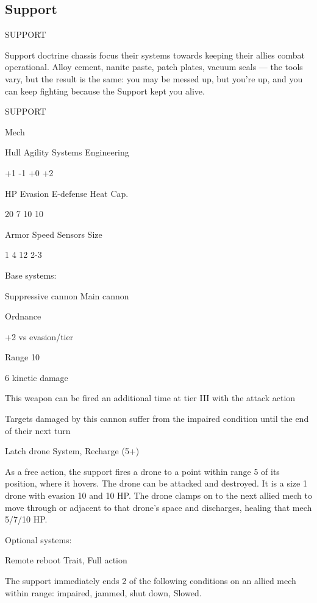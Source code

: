 \subsection{Support}

                                               SUPPORT

Support doctrine chassis focus their systems towards keeping their allies combat operational.
Alloy cement, nanite paste, patch plates, vacuum seals — the tools vary, but the result is the
same: you may be messed up, but you’re up, and you can keep fighting because the Support
kept you alive.


 SUPPORT

 Mech

 Hull       Agility      Systems       Engineering

 +1         -1           +0            +2

 HP         Evasion      E-defense     Heat Cap.

 20         7            10            10

 Armor      Speed        Sensors       Size

 1          4            12            2-3

Base systems:

Suppressive cannon
Main cannon

Ordnance

+2 vs evasion/tier

Range 10

6 kinetic damage

This weapon can be fired an additional time at tier III with the attack action

Targets damaged by this cannon suffer from the impaired condition until the end of their next
turn


Latch drone
System, Recharge (5+)

As a free action, the support fires a drone to a point within range 5 of its position, where it
hovers. The drone can be attacked and destroyed. It is a size 1 drone with evasion 10 and 10 HP.
The drone clamps on to the next allied mech to move through or adjacent to that drone’s space
and discharges, healing that mech 5/7/10 HP.


Optional systems:

Remote reboot
Trait, Full action





The support immediately ends 2 of the following conditions on an allied mech within range:
impaired, jammed, shut down, Slowed.


